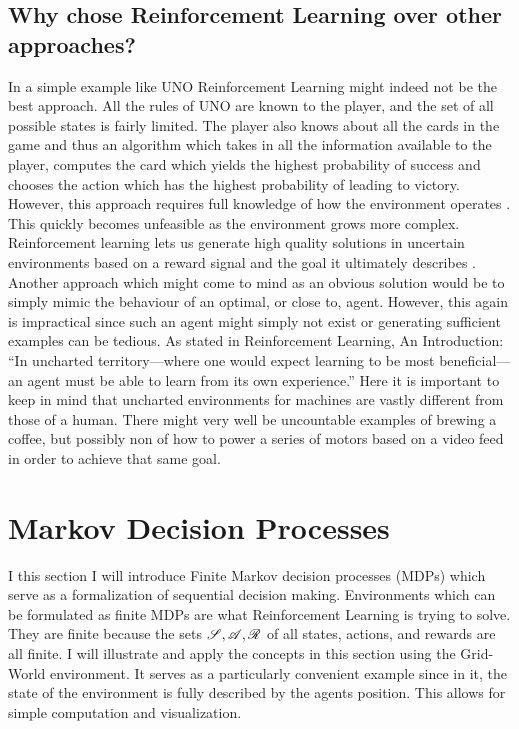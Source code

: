 \subsection*{Why chose Reinforcement Learning over other approaches?}\label{subsec:Why_RL}
In a simple example like UNO Reinforcement Learning might indeed not be the best approach. All the rules of UNO are known to the player, and the set of all possible states is fairly limited. The player also knows about all the cards in the game and thus an algorithm which takes in all the information available to the player, computes the card which yields the highest probability of success and chooses the action which has the highest probability of leading to victory. However, this approach requires full knowledge of how the environment operates \cite[p. 8]{sutton_reinforcement_2018}. This quickly becomes unfeasible as the environment grows more complex. Reinforcement learning lets us generate high quality solutions in uncertain environments based on a reward signal and the goal it ultimately describes \cite[p. 03]{sutton_reinforcement_2018}. Another approach which might come to mind as an obvious solution would be to simply mimic the behaviour of an optimal, or close to, agent. However, this again is impractical since such an agent might simply not exist or generating sufficient examples can be tedious. As stated in Reinforcement Learning, An Introduction: “In uncharted territory—where one would expect learning to be most beneficial—an agent must be able to learn from its own experience.” \cite[p. 02]{sutton_reinforcement_2018} Here it is important to keep in mind that uncharted environments for machines are vastly different from those of a human. There might very well be uncountable examples of brewing a coffee, but possibly non of how to power a series of motors based on a video feed in order to achieve that same goal.

\section{Markov Decision Processes}\label{sec:MDP} %
I this section I will introduce Finite Markov decision processes (MDPs) which serve as a formalization of sequential decision making. Environments which can be formulated as finite MDPs are what Reinforcement Learning is trying to solve. They are finite because the sets $\mathscr{S}, \mathscr{A}, \mathscr{R}$ of all states, actions, and rewards are all finite. I will illustrate and apply the concepts in this section using the Grid-World environment. It serves as a particularly convenient example since in it, the state of the environment is fully described by the agents position. This allows for simple computation and visualization. 

